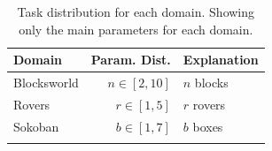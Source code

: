 \begin{table}
\vspace{-10pt}
\centering
\begin{tabular}{lrl}
\toprule
\textbf{Domain} & \textbf{Param. Dist.} & \textbf{Explanation} \\ \midrule
Blocksworld     & $n \in [2,10]$        & $n$ blocks              \\
Rovers          & $r \in [1,5]$         & $r$ rovers              \\
Sokoban         & $b \in [1,7]$         & $b$ boxes               \\
\bottomrule                                                       \\
\end{tabular}
\caption{Task distribution for each domain. Showing only the
  main parameters for each domain.}
\label{tab:domain-params}
\vspace{-10pt}
\end{table}

